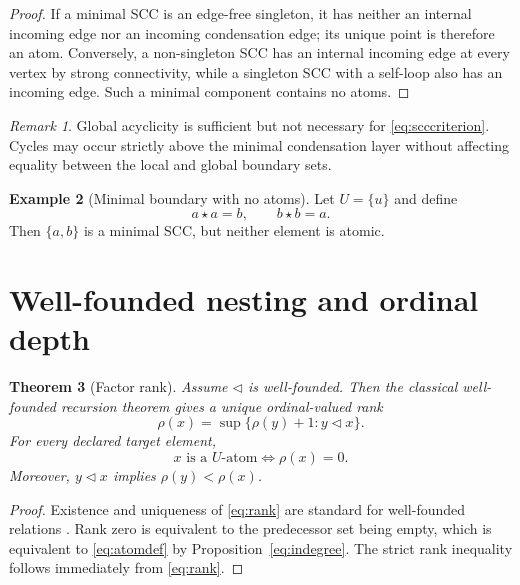 \documentclass[11pt]{article}
\newtheorem{theorem}{Theorem}[section]
\theoremstyle{definition}
\newtheorem{example}[theorem]{Example}
\theoremstyle{remark}
\newtheorem{remark}[theorem]{Remark}
\begin{document}
\begin{proof}
If a minimal SCC is an edge-free singleton, it has neither an internal incoming edge nor an incoming condensation edge; its unique point is therefore an atom. Conversely, a non-singleton SCC has an internal incoming edge at every vertex by strong connectivity, while a singleton SCC with a self-loop also has an incoming edge. Such a minimal component contains no atoms.
\end{proof}

\begin{remark}
Global acyclicity is sufficient but not necessary for \eqref{eq:scccriterion}. Cycles may occur strictly above the minimal condensation layer without affecting equality between the local and global boundary sets.
\end{remark}

\begin{example}[Minimal boundary with no atoms]
Let \(U=\{u\}\) and define
\[
a\star a=b,\qquad b\star b=a.
\]
Then \(\{a,b\}\) is a minimal SCC, but neither element is atomic.
\end{example}

\section{Well-founded nesting and ordinal depth}

\begin{theorem}[Factor rank]
Assume \(\triangleleft\) is well-founded. Then the classical well-founded recursion theorem gives a unique ordinal-valued rank
\begin{equation}
\rho(x)=\sup\{\rho(y)+1:y\triangleleft x\}.
\label{eq:rank}
\end{equation}
For every declared target element,
\begin{equation}
\boxed{x\text{ is a }U\text{-atom}\iff\rho(x)=0.}
\label{eq:rankzero}
\end{equation}
Moreover, \(y\triangleleft x\) implies \(\rho(y)<\rho(x)\).
\end{theorem}

\begin{proof}
Existence and uniqueness of \eqref{eq:rank} are standard for well-founded relations \cite{Jech2003}. Rank zero is equivalent to the predecessor set being empty, which is equivalent to \eqref{eq:atomdef} by Proposition~\ref{eq:indegree}. The strict rank inequality follows immediately from \eqref{eq:rank}.
\end{proof}
\end{document}
